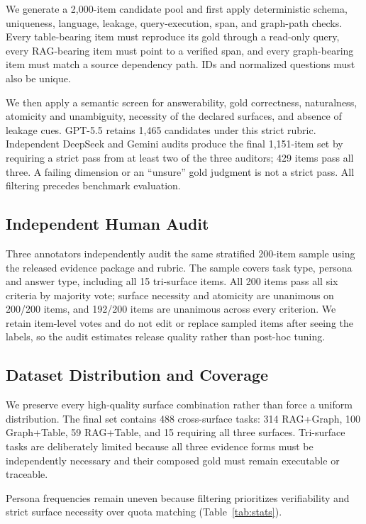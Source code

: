 \documentclass[11pt]{article}
\begin{document}
We generate a 2{,}000-item candidate pool and first apply deterministic schema,
uniqueness, language, leakage, query-execution, span, and graph-path checks.
Every table-bearing item must reproduce its gold through a read-only query,
every RAG-bearing item must point to a verified span, and every graph-bearing
item must match a source dependency path. IDs and normalized questions must
also be unique.

We then apply a semantic screen for answerability, gold correctness,
naturalness, atomicity and unambiguity, necessity of the declared surfaces,
and absence of leakage cues. GPT-5.5 retains 1{,}465 candidates under this
strict rubric. Independent DeepSeek and Gemini audits produce the final
1{,}151-item set by requiring a strict pass from at least two of the three
auditors; 429 items pass all three. A failing dimension or an ``unsure'' gold
judgment is not a strict pass. All filtering precedes benchmark evaluation.

\subsection{Independent Human Audit}
\label{sec:human-eval}
Three annotators independently audit the same stratified 200-item sample using
the released evidence package and rubric. The sample covers task type,
persona and answer type, including all 15 tri-surface items. All 200 items
pass all six criteria by majority vote; surface necessity and atomicity are
unanimous on 200/200 items, and 192/200 items are unanimous across every
criterion. We retain item-level votes and do not edit or replace sampled items
after seeing the labels, so the audit estimates release quality rather than
post-hoc tuning.

\subsection{Dataset Distribution and Coverage}
\label{sec:distribution-coverage}

We preserve every high-quality surface combination rather than force a
uniform distribution. The final set contains 488 cross-surface tasks:
314 RAG+Graph, 100 Graph+Table, 59 RAG+Table, and 15 requiring all three
surfaces. Tri-surface tasks are deliberately limited because all three
evidence forms must be independently necessary and their composed gold must
remain executable or traceable.

Persona frequencies remain uneven because filtering prioritizes verifiability
and strict surface necessity over quota matching (Table~\ref{tab:stats}).
\end{document}
